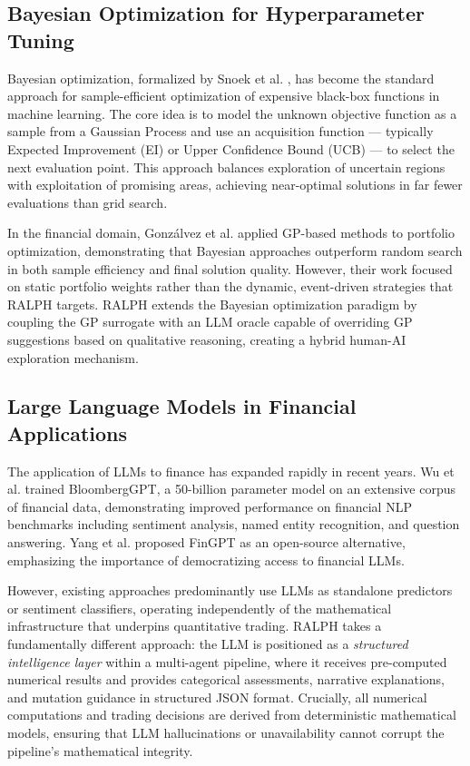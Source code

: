 \documentclass[conference]{IEEEtran}
\begin{document}
\subsection{Bayesian Optimization for Hyperparameter Tuning}
Bayesian optimization, formalized by Snoek et al. \cite{snoek2012practical}, has become the standard approach for sample-efficient optimization of expensive black-box functions in machine learning. The core idea is to model the unknown objective function as a sample from a Gaussian Process and use an acquisition function --- typically Expected Improvement (EI) or Upper Confidence Bound (UCB) --- to select the next evaluation point. This approach balances exploration of uncertain regions with exploitation of promising areas, achieving near-optimal solutions in far fewer evaluations than grid search.

In the financial domain, Gonz\'{a}lvez et al. \cite{gonzalvez2019financial} applied GP-based methods to portfolio optimization, demonstrating that Bayesian approaches outperform random search in both sample efficiency and final solution quality. However, their work focused on static portfolio weights rather than the dynamic, event-driven strategies that RALPH targets. RALPH extends the Bayesian optimization paradigm by coupling the GP surrogate with an LLM oracle capable of overriding GP suggestions based on qualitative reasoning, creating a hybrid human-AI exploration mechanism.

\subsection{Large Language Models in Financial Applications}
The application of LLMs to finance has expanded rapidly in recent years. Wu et al. \cite{wu2023bloomberggpt} trained BloombergGPT, a 50-billion parameter model on an extensive corpus of financial data, demonstrating improved performance on financial NLP benchmarks including sentiment analysis, named entity recognition, and question answering. Yang et al. \cite{yang2023fingpt} proposed FinGPT as an open-source alternative, emphasizing the importance of democratizing access to financial LLMs.

However, existing approaches predominantly use LLMs as standalone predictors or sentiment classifiers, operating independently of the mathematical infrastructure that underpins quantitative trading. RALPH takes a fundamentally different approach: the LLM is positioned as a \textit{structured intelligence layer} within a multi-agent pipeline, where it receives pre-computed numerical results and provides categorical assessments, narrative explanations, and mutation guidance in structured JSON format. Crucially, all numerical computations and trading decisions are derived from deterministic mathematical models, ensuring that LLM hallucinations or unavailability cannot corrupt the pipeline's mathematical integrity.
\end{document}
